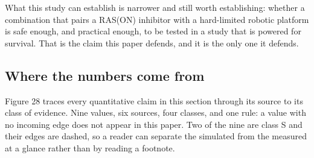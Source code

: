 What this study can establish is narrower and still worth establishing: whether
a combination that pairs a RAS(ON) inhibitor with a hard-limited robotic
platform is safe enough, and practical enough, to be tested in a study that is
powered for survival. That is the claim this paper defends, and it is the only
one it defends.

\subsection{Where the numbers come from}

Figure 28 traces every quantitative claim in this section through its source to
its class of evidence. Nine values, six sources, four classes, and one rule: a
value with no incoming edge does not appear in this paper. Two of the nine are
class S and their edges are dashed, so a reader can separate the simulated from
the measured at a glance rather than by reading a footnote.

